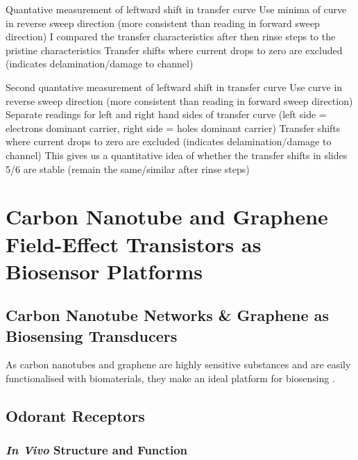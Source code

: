 \documentclass[
  a4paper,
]{scrbook}
\begin{document}
Quantative measurement of leftward shift in transfer curve Use minima of
curve in reverse sweep direction (more consistent than reading in
forward sweep direction) I compared the transfer characteristics after
then rinse steps to the pristine characteristics Transfer shifts where
current drops to zero are excluded (indicates delamination/damage to
channel)

Second quantative measurement of leftward shift in transfer curve Use
curve in reverse sweep direction (more consistent than reading in
forward sweep direction) Separate readings for left and right hand sides
of transfer curve (left side = electrons dominant carrier, right side =
holes dominant carrier) Transfer shifts where current drops to zero are
excluded (indicates delamination/damage to channel) This gives us a
quantitative idea of whether the transfer shifts in slides 5/6 are
stable (remain the same/similar after rinse steps)


\hypertarget{carbon-nanotube-and-graphene-field-effect-transistors-as-biosensor-platforms}{%
\chapter{Carbon Nanotube and Graphene Field-Effect Transistors as
Biosensor
Platforms}\label{carbon-nanotube-and-graphene-field-effect-transistors-as-biosensor-platforms}}

\hypertarget{sec-biosensing-transducers}{%
\section{Carbon Nanotube Networks \& Graphene as Biosensing
Transducers}\label{sec-biosensing-transducers}}

As carbon nanotubes and graphene are highly sensitive substances and are
easily functionalised with biomaterials, they make an ideal platform for
biosensing \autocite{Battie2010,Ohno2010,Benlikaya2019,Goodwin2021}.

\hypertarget{sec-odorant-receptors}{%
\section{Odorant Receptors}\label{sec-odorant-receptors}}

\hypertarget{in-vivo-structure-and-function}{%
\subsection{\texorpdfstring{\emph{In Vivo} Structure and
Function}{In Vivo Structure and Function}}\label{in-vivo-structure-and-function}}
\end{document}
